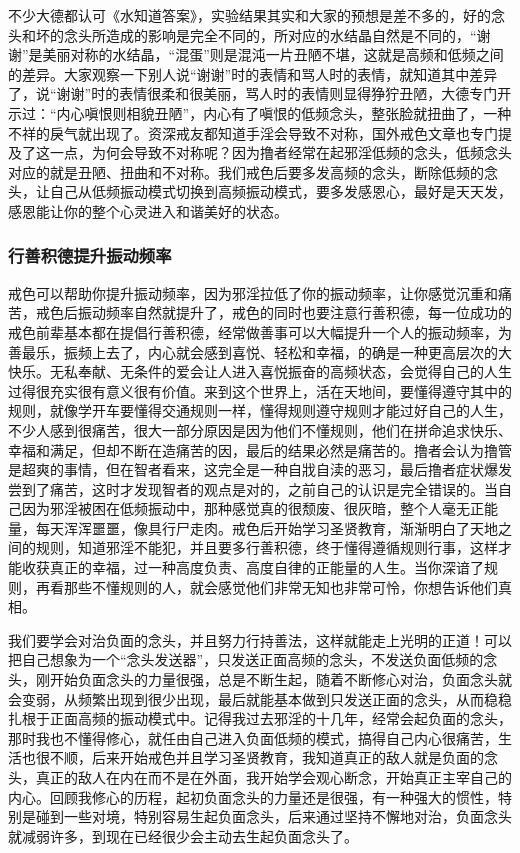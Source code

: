 不少大德都认可《水知道答案》，实验结果其实和大家的预想是差不多的，好的念头和坏的念头所造成的影响是完全不同的，所对应的水结晶自然是不同的，“谢谢”是美丽对称的水结晶，“混蛋”则是混沌一片丑陋不堪，这就是高频和低频之间的差异。大家观察一下别人说“谢谢”时的表情和骂人时的表情，就知道其中差异了，说“谢谢”时的表情很柔和很美丽，骂人时的表情则显得狰狞丑陋，大德专门开示过：“内心嗔恨则相貌丑陋”，内心有了嗔恨的低频念头，整张脸就扭曲了，一种不祥的戾气就出现了。资深戒友都知道手淫会导致不对称，国外戒色文章也专门提及了这一点，为何会导致不对称呢？因为撸者经常在起邪淫低频的念头，低频念头对应的就是丑陋、扭曲和不对称。我们戒色后要多发高频的念头，断除低频的念头，让自己从低频振动模式切换到高频振动模式，要多发感恩心，最好是天天发，感恩能让你的整个心灵进入和谐美好的状态。

\subsubsection{行善积德提升振动频率}

戒色可以帮助你提升振动频率，因为邪淫拉低了你的振动频率，让你感觉沉重和痛苦，戒色后振动频率自然就提升了，戒色的同时也要注意行善积德，每一位成功的戒色前辈基本都在提倡行善积德，经常做善事可以大幅提升一个人的振动频率，为善最乐，振频上去了，内心就会感到喜悦、轻松和幸福，的确是一种更高层次的大快乐。无私奉献、无条件的爱会让人进入喜悦振奋的高频状态，会觉得自己的人生过得很充实很有意义很有价值。来到这个世界上，活在天地间，要懂得遵守其中的规则，就像学开车要懂得交通规则一样，懂得规则遵守规则才能过好自己的人生，不少人感到很痛苦，很大一部分原因是因为他们不懂规则，他们在拼命追求快乐、幸福和满足，但却不断在造痛苦的因，最后的结果必然是痛苦的。撸者会认为撸管是超爽的事情，但在智者看来，这完全是一种自戕自渎的恶习，最后撸者症状爆发尝到了痛苦，这时才发现智者的观点是对的，之前自己的认识是完全错误的。当自己因为邪淫被困在低频振动中，那种感觉真的很颓废、很灰暗，整个人毫无正能量，每天浑浑噩噩，像具行尸走肉。戒色后开始学习圣贤教育，渐渐明白了天地之间的规则，知道邪淫不能犯，并且要多行善积德，终于懂得遵循规则行事，这样才能收获真正的幸福，过一种高度负责、高度自律的正能量的人生。当你深谙了规则，再看那些不懂规则的人，就会感觉他们非常无知也非常可怜，你想告诉他们真相。

我们要学会对治负面的念头，并且努力行持善法，这样就能走上光明的正道！可以把自己想象为一个“念头发送器”，只发送正面高频的念头，不发送负面低频的念头，刚开始负面念头的力量很强，总是不断生起，随着不断修心对治，负面念头就会变弱，从频繁出现到很少出现，最后就能基本做到只发送正面的念头，从而稳稳扎根于正面高频的振动模式中。记得我过去邪淫的十几年，经常会起负面的念头，那时我也不懂得修心，就任由自己进入负面低频的模式，搞得自己内心很痛苦，生活也很不顺，后来开始戒色并且学习圣贤教育，我知道真正的敌人就是负面的念头，真正的敌人在内在而不是在外面，我开始学会观心断念，开始真正主宰自己的内心。回顾我修心的历程，起初负面念头的力量还是很强，有一种强大的惯性，特别是碰到一些对境，特别容易生起负面念头，后来通过坚持不懈地对治，负面念头就减弱许多，到现在已经很少会主动去生起负面念头了。

